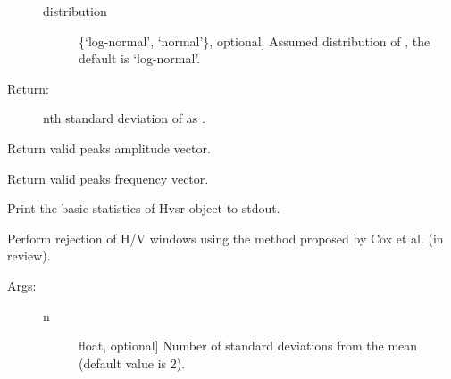 \documentclass[letterpaper,10pt,english,openany,oneside]{sphinxmanual}
\begin{document}
\begin{fulllineitems}
\begin{fulllineitems}
\begin{description}
\begin{description}
\item[{distribution}] \leavevmode{[}\{‘log-normal’, ‘normal’\}, optional{]}
Assumed distribution of , the default is
‘log-normal’.

\end{description}

\item[{Return:}] \leavevmode
nth standard deviation of  as .

\end{description}

\end{fulllineitems}


\begin{fulllineitems}
\label{\detokenize{index:hvsrpy.Hvsr.peak_amp}}
Return valid peaks amplitude vector.

\end{fulllineitems}


\begin{fulllineitems}
\label{\detokenize{index:hvsrpy.Hvsr.peak_frq}}
Return valid peaks frequency vector.

\end{fulllineitems}


\begin{fulllineitems}
\label{\detokenize{index:hvsrpy.Hvsr.print_stats}}
Print the basic statistics of Hvsr object to stdout.

\end{fulllineitems}


\begin{fulllineitems}
\label{\detokenize{index:hvsrpy.Hvsr.reject_windows}}
Perform rejection of H/V windows using the method proposed by
Cox et al. (in review).
\begin{description}
\item[{Args:}] \leavevmode\begin{description}
\item[{n}] \leavevmode{[}float, optional{]}
Number of standard deviations from the mean (default
value is 2).


\end{description}
\end{description}
\end{fulllineitems}
\end{fulllineitems}
\end{document}
